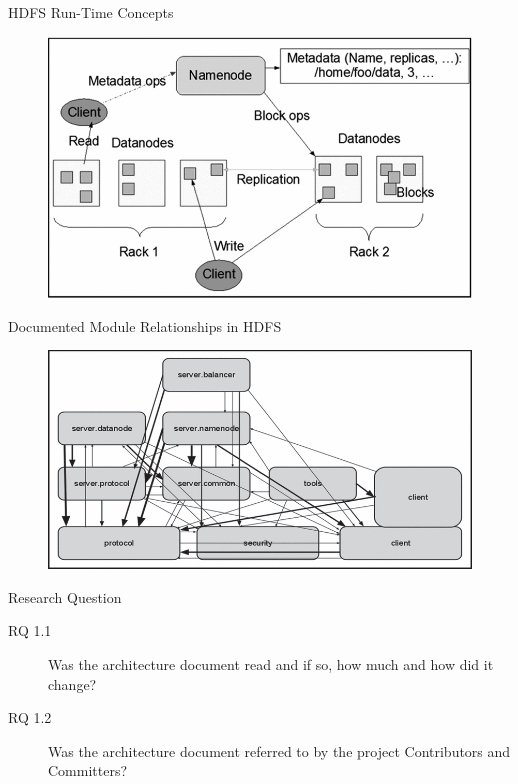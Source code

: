 \documentclass[t,14pt,mathserif]{beamer}
\begin{document}
\begin{frame}{HDFS Run-Time Concepts}
	\begin{figure}[!t]
		\centering
		\includegraphics[width=4.5in]{../img/run-time-concept}
		\label{fig:diagrama-run-time}
	\end{figure}
\end{frame}


\begin{frame}{Documented Module Relationships in HDFS}
	\begin{figure}[!t]
		\centering
		\includegraphics[width=4.5in]{../img/module-relationships}
		\label{fig:module-relationships}
	\end{figure}
\end{frame}

\begin{frame}{Research Question}
	
	\begin{description}
		\item[RQ 1.1] Was the architecture document read and if so, how much and how did it change?
		\item[RQ 1.2] Was the architecture document referred to by the project Contributors and Committers?
	\end{description}
	
\end{frame}
\end{document}
